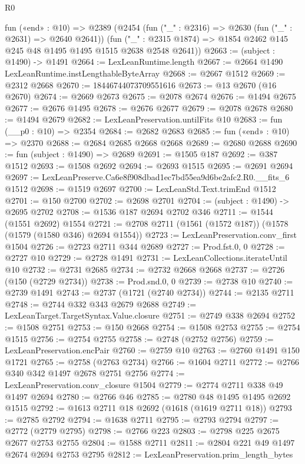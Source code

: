 \begin{lexlean}{R0}
\begin{coremodule}
  fun («end» : @10) =>
  @2389
    (@2454
      (fun ("_" : @2316) => @2630 (fun ("_" : @2631) => @2640 @2641))
      (fun ("_" : @2315 @1874) => @1854 @2462 @145 @245 @48 @1495 @1495 @1515 @2638 @2548 @2641))
@2663 := (subject : @1490) -> @1491
@2664 := LexLeanRuntime.length
@2667 := @2664 @1490 LexLeanRuntime.instLengthableByteArray
@2668 := @2667 @1512
@2669 := @2312 @2668
@2670 := 18446744073709551616
@2673 := @13 @2670 (@16 @2670)
@2674 := @2669 @2673
@2675 := @2078 @2674
@2676 := @1494 @2675
@2677 := @2676 @1495
@2678 := @2676 @2677
@2679 := @2078 @2678
@2680 := @1494 @2679
@2682 := LexLeanPreservation.untilFits @10
@2683 := fun (__p0 : @10) => @2354
@2684 := @2682 @2683
@2685 := fun («end» : @10) => @2370
@2688 := @2684 @2685 @2668 @2668
@2689 := @2680 @2688
@2690 := fun (subject : @1490) => @2689
@2691 := @1505 @187
@2692 := @387 @1512
@2693 := @1508 @2692
@2694 := @2693 @1515
@2695 := @2691 @2694
@2697 := LexLeanPreserve.Ca6e8f908dbad1ec7bd55ea9d6be2afc2.R0.__fits_6 @1512
@2698 := @1519 @2697
@2700 := LexLeanStd.Text.trimEnd @1512
@2701 := @150 @2700
@2702 := @2698 @2701
@2704 := (subject : @1490) -> @2695 @2702
@2708 := @1536 @187 @2694 @2702 @346
@2711 := @1544 (@1551 @2692) @1554
@2721 := @2708 @2711 (@1561 (@1572 @187)) (@1578 (@1579 (@1580 @346) @2694 @1554))
@2723 := LexLeanPreservation.conv_first @1504
@2726 := @2723 @2711 @344 @2689
@2727 := Prod.fst.{0, 0}
@2728 := @2727 @10
@2729 := @2728 @1491
@2731 := LexLeanCollections.iterateUntil @10
@2732 := @2731 @2685
@2734 := @2732 @2668 @2668
@2737 := @2726 (@150 (@2729 @2734))
@2738 := Prod.snd.{0, 0}
@2739 := @2738 @10
@2740 := @2739 @1491
@2743 := @2737 (@1721 (@2740 @2734))
@2744 := @2135 @2711
@2748 := @2744 @332 @343 @2679 @2688
@2749 := LexLeanTarget.TargetSyntax.Value.closure
@2751 := @2749 @338 @2694
@2752 := @1508 @2751
@2753 := @150 @2668
@2754 := @1508 @2753
@2755 := @2754 @1515
@2756 := @2754 @2755
@2758 := @2748 (@2752 @2756)
@2759 := LexLeanPreservation.encPair
@2760 := @2759 @10
@2763 := @2760 @1491 @150 @1721
@2765 := @2758 (@2763 @2734)
@2766 := @1604 @2711
@2772 := @2766 @340 @342 @1497 @2678 @2751 @2756
@2774 := LexLeanPreservation.conv_closure @1504
@2779 := @2774 @2711 @338 @49 @1497 @2694
@2780 := @2766 @46
@2785 := @2780 @48 @1495 @1495 @2692 @1515
@2792 := @1613 @2711 @18 @2692 (@1618 (@1619 @2711 @18))
@2793 := @2785 @2792
@2794 := @1638 @2711
@2795 := @2793 @2794
@2797 := @2772 (@2779 @2795)
@2798 := @2766 @223
@2803 := @2798 @225 @2675 @2677 @2753 @2755
@2804 := @1588 @2711
@2811 := @2804 @221 @49 @1497 @2674 @2694 @2753 @2795
@2812 := LexLeanPreservation.prim_length_bytes

\end{coremodule}
\end{lexlean}
